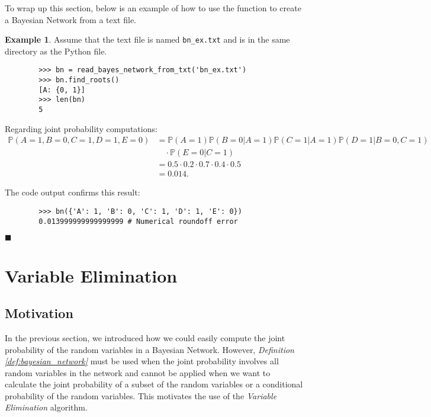 \documentclass{article}
\theoremstyle{definition}
\newtheorem{example}{Example}
\newenvironment{exampleqed}
    {\begin{example}}
    {\hfill \qedsymbol \end{example}}
\renewcommand{\qedsymbol}{\(\blacksquare\)}
\renewcommand{\P}{\mathbb{P}}
\begin{document}
To wrap up this section, below is an example of how to use the function to create a Bayesian Network from a text file.

\begin{exampleqed}
    Assume that the text file is named \texttt{\texttt{bn\_ex.txt}} and is in the same directory as the Python file.

    \begin{verbatim}
        >>> bn = read_bayes_network_from_txt('bn_ex.txt')
        >>> bn.find_roots()
        [A: {0, 1}]
        >>> len(bn)
        5
    \end{verbatim}

    Regarding joint probability computations:
    \begin{align*}
        \P(A=1, B=0, C=1, D=1, E=0) &= \P(A=1)\P(B=0|A=1)\P(C=1|A=1)\P(D=1|B=0,C=1) \\
        &\quad \cdot \P(E=0|C=1) \\
        &= 0.5 \cdot 0.2 \cdot 0.7 \cdot 0.4 \cdot 0.5 \\
        &= 0.014.
    \end{align*}

    The code output confirms this result:

    \begin{verbatim}
        >>> bn({'A': 1, 'B': 0, 'C': 1, 'D': 1, 'E': 0})
        0.013999999999999999 # Numerical roundoff error
    \end{verbatim}
\end{exampleqed}

\pagebreak

\section{Variable Elimination} \label{sec:variable_elimination}

\subsection{Motivation}

In the previous section, we introduced how we could easily compute the joint probability of the random variables in a Bayesian Network. However, \textit{Definition \ref{def:bayesian_network}} must be used when the joint probability involves all random variables in the network and cannot be applied when we want to calculate the joint probability of a subset of the random variables or a conditional probability of the random variables. This motivates the use of the \textit{Variable Elimination} algorithm.
\end{document}
